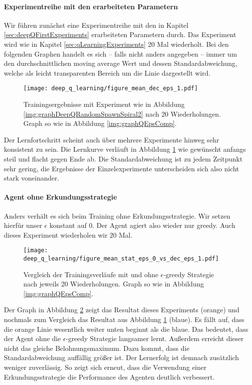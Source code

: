 \paragraph{Experimentreihe mit den erarbeiteten Parametern}
Wir führen zunächst eine Experimentreihe mit den in Kapitel \ref{sec:deepQFirstExperiments} erarbeiteten Parametern durch. Das Experiment wird wie in Kapitel \ref{sec:qLearningExperiments} 20 Mal wiederholt. Bei den folgenden Graphen handelt es sich -- falls nicht anders angegeben -- immer um den durchschnittlichen moving average Wert und dessen Standardabweichung, welche als leicht transparenten Bereich um die Linie dargestellt wird.
\begin{figure}[h!]
    \centering
    \texttt{[image: deep\_q\_learning/figure\_mean\_dec\_eps\_1.pdf]}
    \caption{Trainingsergebnisse mit Experiment wie in Abbildung \ref{img:graphDeepQRandomSpawnSpiral2} nach 20 Wiederholungen. Graph so wie in Abbildung \ref{img:graphQEpsComp}.} \label{img:graphDeepQMeanDecEps1}

\end{figure}

Der Lernfortschritt scheint auch über mehrere Experimente hinweg sehr konsistent zu sein. Die Lernkurve verläuft in Abbildung \ref{img:graphDeepQMeanDecEps1} wie gewünscht anfangs steil und flacht gegen Ende ab. Die Standardabweichung ist zu jedem Zeitpunkt sehr gering, die Ergebnisse der Einzelexperimente unterscheiden sich also nicht stark voneinander. 

\paragraph{Agent ohne Erkundungsstrategie}
Anders verhält es sich beim Training ohne Erkundungsstrategie. Wir setzen hierfür unser $ \epsilon $ konstant auf 0. Der Agent agiert also wieder nur greedy. Auch dieses Experiment wiederholen wir 20 Mal.
\begin{figure}[h!]
    \centering
    \texttt{[image: deep\_q\_learning/figure\_mean\_stat\_eps\_0\_vs\_dec\_eps\_1.pdf]}
    \caption{Vergleich der Trainingsverläufe mit und ohne $ \epsilon $-greedy Strategie nach jeweils 20 Wiederholungen. Graph so wie in Abbildung \ref{img:graphQEpsComp}.} \label{img:graphDeepQMeanStatEps0VsDecEps1}
\end{figure}
Der Graph in Abbildung \ref{img:graphDeepQMeanStatEps0VsDecEps1} zeigt das Resultat dieses Experiments (orange) und nochmals zum Vergleich das Resultat aus Abbildung \ref{img:graphDeepQMeanDecEps1} (blaue). Es fällt auf, dass die orange Linie wesentlich weiter unten beginnt als die blaue. Das bedeutet, dass der Agent ohne die $ \epsilon $-greedy Strategie langsamer lernt. Außerdem erreicht dieser nicht das gleiche Belohnungsmaximum. Dazu kommt, dass die Standardabweichung auffällig größer ist. Der Lernerfolg ist demnach zusätzlich weniger zuverlässig. So zeigt sich erneut, dass die Verwendung einer Erkundungsstrategie die Performance des Agenten deutlich verbessert.

